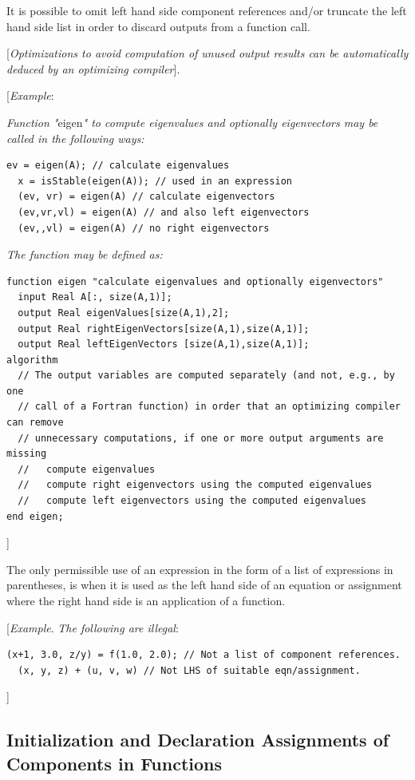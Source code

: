 \documentclass[10pt,a4paper]{report}
\def\doublelabel#1{\label{#1}}
\begin{document}
It is possible to omit left hand side component references and/or
truncate the left hand side list in order to discard outputs from a
function call.

{[}\emph{Optimizations to avoid computation of unused output results can
be automatically deduced by an optimizing compiler}{]}.

{[}\emph{Example}:

\emph{Function "}eigen\emph{" to compute eigenvalues and optionally
eigenvectors may be called in the following ways:}

\begin{lstlisting}[language=modelica]
  ev = eigen(A); // calculate eigenvalues
  x = isStable(eigen(A)); // used in an expression
  (ev, vr) = eigen(A) // calculate eigenvectors
  (ev,vr,vl) = eigen(A) // and also left eigenvectors
  (ev,,vl) = eigen(A) // no right eigenvectors
\end{lstlisting}
\emph{The function may be defined as:}

\begin{lstlisting}[language=modelica]
function eigen "calculate eigenvalues and optionally eigenvectors"
  input Real A[:, size(A,1)];
  output Real eigenValues[size(A,1),2];
  output Real rightEigenVectors[size(A,1),size(A,1)];
  output Real leftEigenVectors [size(A,1),size(A,1)];
algorithm
  // The output variables are computed separately (and not, e.g., by one
  // call of a Fortran function) in order that an optimizing compiler can remove
  // unnecessary computations, if one or more output arguments are missing
  //   compute eigenvalues
  //   compute right eigenvectors using the computed eigenvalues
  //   compute left eigenvectors using the computed eigenvalues
end eigen;
\end{lstlisting}
{]}

The only permissible use of an expression in the form of a list of
expressions in parentheses, is when it is used as the left hand side of
an equation or assignment where the right hand side is an application of
a function.

{[}\emph{Example}. \emph{The following are illegal}:

\begin{lstlisting}[language=modelica]
  (x+1, 3.0, z/y) = f(1.0, 2.0); // Not a list of component references.
  (x, y, z) + (u, v, w) // Not LHS of suitable eqn/assignment.
\end{lstlisting}
{]}

\subsection{Initialization and Declaration Assignments of Components in Functions}\doublelabel{initialization-and-declaration-assignments-of-components-in-functions}
\end{document}
